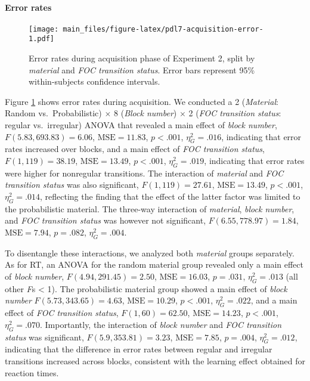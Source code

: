 \documentclass[jou]{apa6}
\theoremstyle{definition}
\theoremstyle{definition}
\theoremstyle{definition}
\theoremstyle{remark}
\begin{document}
\paragraph{Error rates}\label{error-rates-1}

\begin{figure}[htbp]
\centering
\texttt{[image: main\_files/figure-latex/pdl7-acquisition-error-1.pdf]}
\caption{\label{fig:pdl7-acquisition-error}Error rates during acquisition
phase of Experiment 2, split by \emph{material} and \emph{FOC transition
status}. Error bars represent 95\% within-subjects confidence
intervals.}
\end{figure}

Figure \ref{fig:pdl7-acquisition-error} shows error rates during
acquisition. We conducted a 2 (\emph{Material}: Random
vs.~Probabilistic) \(\times\) 8 (\emph{Block number}) \(\times\) 2
(\emph{FOC transition status}: regular vs.~irregular) ANOVA that
revealed a main effect of \emph{block number},
\(F(5.83, 693.83) = 6.06\), \(\mathrm{MSE} = 11.83\), \(p < .001\),
\(\eta^2_G = .016\), indicating that error rates increased over blocks,
and a main effect of \emph{FOC transition status},
\(F(1, 119) = 38.19\), \(\mathrm{MSE} = 13.49\), \(p < .001\),
\(\eta^2_G = .019\), indicating that error rates were higher for
nonregular transitions. The interaction of \emph{material} and \emph{FOC
transition status} was also significant, \(F(1, 119) = 27.61\),
\(\mathrm{MSE} = 13.49\), \(p < .001\), \(\eta^2_G = .014\), reflecting
the finding that the effect of the latter factor was limited to the
probabilistic material. The three-way interaction of \emph{material},
\emph{block number}, and \emph{FOC transition status} was however not
significant, \(F(6.55, 778.97) = 1.84\), \(\mathrm{MSE} = 7.94\),
\(p = .082\), \(\eta^2_G = .004\).

To disentangle these interactions, we analyzed both \emph{material}
groups separately. As for RT, an ANOVA for the random material group
revealed only a main effect of \emph{block number},
\(F(4.94, 291.45) = 2.50\), \(\mathrm{MSE} = 16.03\), \(p = .031\),
\(\eta^2_G = .013\) (all other \emph{F}s \textless{} 1). The
probabilistic material group showed a main effect of \emph{block number}
\(F(5.73, 343.65) = 4.63\), \(\mathrm{MSE} = 10.29\), \(p < .001\),
\(\eta^2_G = .022\), and a main effect of \emph{FOC transition status},
\(F(1, 60) = 62.50\), \(\mathrm{MSE} = 14.23\), \(p < .001\),
\(\eta^2_G = .070\). Importantly, the interaction of \emph{block number}
and \emph{FOC transition status} was significant,
\(F(5.9, 353.81) = 3.23\), \(\mathrm{MSE} = 7.85\), \(p = .004\),
\(\eta^2_G = .012\), indicating that the difference in error rates
between regular and irregular transitions increased across blocks,
consistent with the learning effect obtained for reaction times.
\end{document}
